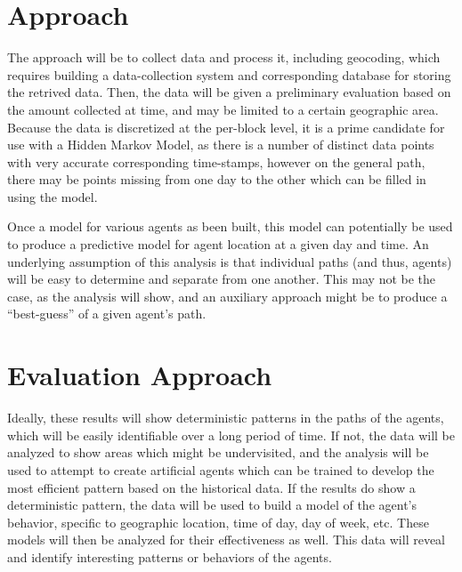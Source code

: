 \documentclass[conference]{IEEEtran}
\begin{document}
\section{Approach}
\label{sec:approach}
The approach will be to collect data and process it, including geocoding, which
requires building a data-collection system and corresponding database for
storing the retrived data. Then, the data will be given a preliminary evaluation
based on the amount collected at time, and may be limited to a certain
geographic area. Because the data is discretized at the per-block level, it is a
prime candidate for use with a Hidden Markov Model, as there is a number of
distinct data points with very accurate corresponding time-stamps, however on
the general path, there may be points missing from one day to the other which
can be filled in using the model.

Once a model for various agents as been built, this model can potentially be
used to produce a predictive model for agent location at a given day and time.
An underlying assumption of this analysis is that individual paths (and thus,
agents) will be easy to determine and separate from one another. This may not be
the case, as the analysis will show, and an auxiliary approach might be to
produce a ``best-guess'' of a given agent's path.

\section{Evaluation Approach}
\label{sec:results}
Ideally, these results will show deterministic patterns in the paths of the
agents, which will be easily identifiable over a long period of time. If not,
the data will be analyzed to show areas which might be undervisited, and the
analysis will be used to attempt to create artificial agents which can be
trained to develop the most efficient pattern based on the historical data. If
the results do show a deterministic pattern, the data will be used to build a
model of the agent's behavior, specific to geographic location, time of day, day
of week, etc. These models will then be analyzed for their effectiveness as
well. This data will reveal and identify interesting patterns or behaviors of
the agents.
\end{document}

